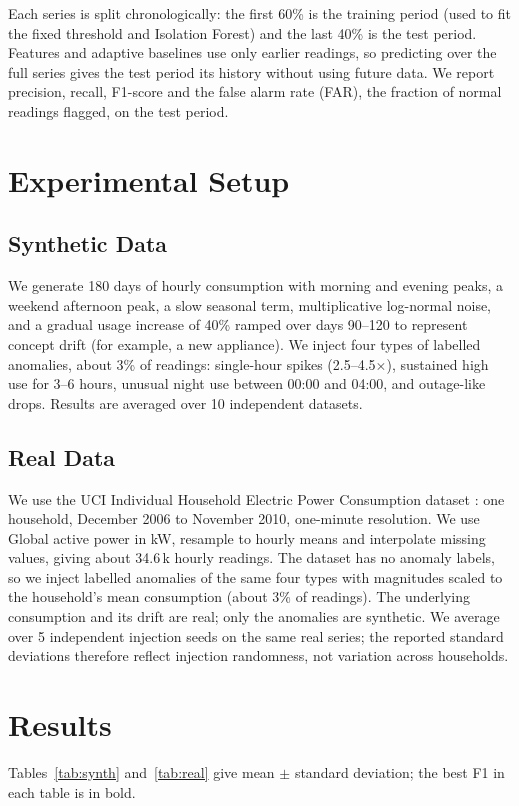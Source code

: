 \documentclass[conference]{IEEEtran}
\begin{document}
Each series is split chronologically: the first 60\% is the training period (used to fit the fixed threshold and Isolation Forest) and the last 40\% is the test period. Features and adaptive baselines use only earlier readings, so predicting over the full series gives the test period its history without using future data. We report precision, recall, F1-score and the false alarm rate (FAR), the fraction of normal readings flagged, on the test period.

\section{Experimental Setup}
\subsection{Synthetic Data}
We generate 180 days of hourly consumption with morning and evening peaks, a weekend afternoon peak, a slow seasonal term, multiplicative log-normal noise, and a gradual usage increase of 40\% ramped over days 90--120 to represent concept drift (for example, a new appliance). We inject four types of labelled anomalies, about 3\% of readings: single-hour spikes (2.5--4.5$\times$), sustained high use for 3--6 hours, unusual night use between 00:00 and 04:00, and outage-like drops. Results are averaged over 10 independent datasets.

\subsection{Real Data}
We use the UCI Individual Household Electric Power Consumption dataset \cite{hebrail2006}: one household, December 2006 to November 2010, one-minute resolution. We use Global active power in kW, resample to hourly means and interpolate missing values, giving about 34.6\,k hourly readings. The dataset has no anomaly labels, so we inject labelled anomalies of the same four types with magnitudes scaled to the household's mean consumption (about 3\% of readings). The underlying consumption and its drift are real; only the anomalies are synthetic. We average over 5 independent injection seeds on the same real series; the reported standard deviations therefore reflect injection randomness, not variation across households.

\section{Results}
Tables~\ref{tab:synth} and~\ref{tab:real} give mean $\pm$ standard deviation; the best F1 in each table is in bold.
\end{document}
